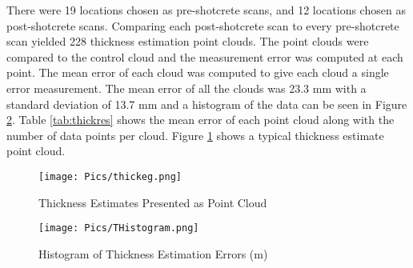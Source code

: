 There were 19 locations chosen as pre-shotcrete scans, and 12 locations chosen as post-shotcrete scans. Comparing each post-shotcrete scan to every pre-shotcrete scan yielded 228 thickness estimation point clouds. The point clouds were compared to the control cloud and the measurement error was computed at each point. The mean error of each cloud was computed to give each cloud a single error measurement. The mean error of all the clouds was 23.3 mm with a standard deviation of 13.7 mm and a histogram of the data can be seen in Figure \ref{fig:thist}. Table \ref{tab:thickres} shows the mean error of each point cloud along with the number of data points per cloud. Figure \ref{fig:thickeg} shows a typical thickness estimate point cloud.\\

\begin{figure}[h]
    \centering
    \texttt{[image: Pics/thickeg.png]}
    \caption{Thickness Estimates Presented as Point Cloud}
    \label{fig:thickeg}
\end{figure}
\begin{figure}[h]
    \centering
    \texttt{[image: Pics/THistogram.png]}
    \caption{Histogram of Thickness Estimation Errors (m)}
    \label{fig:thist}
\end{figure}
\clearpage
